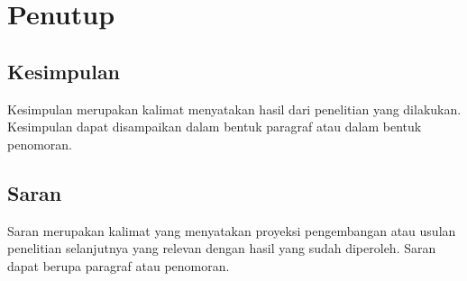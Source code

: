 \chapter{Penutup}
\label{bab:penutup}

\section{Kesimpulan}
\label{sec:kesimpulan}

Kesimpulan merupakan kalimat menyatakan hasil dari penelitian yang dilakukan. Kesimpulan dapat disampaikan dalam bentuk paragraf atau dalam bentuk penomoran.

\section{Saran}
\label{sec:saran}

Saran merupakan kalimat yang menyatakan proyeksi pengembangan atau usulan penelitian selanjutnya yang relevan dengan hasil yang sudah diperoleh. Saran dapat berupa paragraf atau penomoran.

